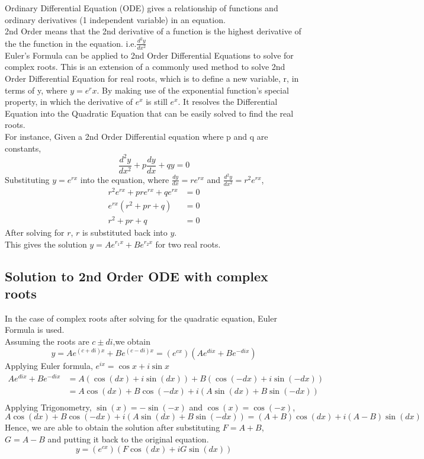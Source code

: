 \documentclass[a4paper,12pt,oneside]{book}
\begin{document}
Ordinary Differential Equation (ODE) gives a relationship of  functions and ordinary derivatives (1 independent variable) in an equation. 
\smallskip\\
2nd Order means that the 2nd derivative of a function is the highest derivative of the the function in the equation. i.e.$\frac{d^2y}{dx^2}$
\smallskip\\
Euler's Formula can be applied to 2nd Order Differential Equations to solve for complex roots. This is an extension of a commonly used method to solve 2nd Order Differential Equation for real roots, which is to define a new variable, r, in terms of y, where $y= e^rx$. By making use of the exponential function's special property, in which the derivative of $e^x$ is still $e^x$. It resolves the Differential Equation into the Quadratic Equation that can be easily solved to find the real roots.\\ For instance,
Given a 2nd Order Differential equation where p and q are constants,
\begin{equation*}
    \frac{d^2y}{dx^2}+ p\frac{dy}{dx}+qy = 0
\end{equation*}
Substituting $y= e^{rx}$ into the equation, where $\frac{dy}{dx}= re^{rx}$ and $\frac{d^2y}{dx^2}= r^2e^{rx}$,
\begin{align*}
    r^2e^{rx} + pre^{rx} +qe^{rx} &= 0  \\
    e^{rx}\left( r^2 + pr +q \right) &= 0 \\
    r^2 + pr +q &= 0
\end{align*}
After solving for $r$, $r$ is substituted back into $y$.\\
This gives the solution $y = Ae^{r_1x} + Be^{r_2x}$ for two real roots.\\
\subsection{Solution to 2nd Order ODE with complex roots}
In the case of complex roots after solving for the quadratic equation, Euler Formula is used. \\
Assuming the roots are $c\pm di$,we obtain\\ $$y = Ae^{(c+di)x} + Be^{(c-di)x}= (e^{cx})\left( Ae^{dix} + Be^{-dix} \right)$$
Applying Euler formula, $e^{ix} = \cos{x} + i \sin{x}$
\begin{align*}
    Ae^{dix} + Be^{-dix} &= A(\cos(dx) + i \sin(dx)) + B(\cos(-dx) + i \sin(-dx))\\
    &= A\cos(dx) + B\cos(-dx) + i(A\sin(dx) + B\sin(-dx))\\
\end{align*}
Applying Trigonometry, $\sin(x) = -\sin(-x)$ and $\cos(x) = \cos(-x)$,
\begin{equation*}
    A\cos(dx) + B\cos(-dx) + i(A\sin(dx) + B\sin(-dx)) = (A+B)\cos(dx) + i(A-B)\sin(dx)
\end{equation*}
Hence, we are able to obtain the solution after substituting $F= A+B$, $G= A-B$ and putting it back to the original equation.
\begin{equation*}
    y= (e^{cx})\left(F\cos(dx) + iG\sin(dx)\right)
\end{equation*}
\end{document}
